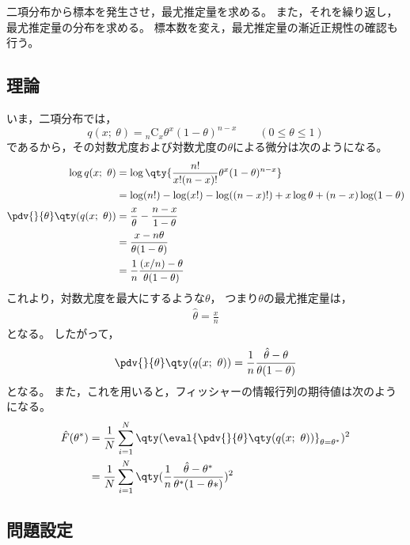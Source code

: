 \documentclass[class=jsarticle, crop=false, dvipdfmx, fleqn]{standalone}
\begin{document}
\section{}

二項分布から標本を発生させ，最尤推定量を求める。
また，それを繰り返し，最尤推定量の分布を求める。
標本数を変え，最尤推定量の漸近正規性の確認も行う。


\subsection*{理論}

いま，二項分布では，
\begin{equation}
    q(x;\ \theta) = {}_n\mathrm{C}_x \theta^x (1-\theta)^{n-x}
    \qquad (0 \le \theta \le 1)
\end{equation}
であるから，その対数尤度および対数尤度の\(\theta\)による微分は次のようになる。
\begin{align}
    \log{q(x;\ \theta)}
        & = \log\qty{\frac{n!}{x!(n-x)!} \theta^x (1-\theta)^{n-x}} \\
        & = \log(n!) - \log(x!) - \log((n-x)!) + x\log\theta + (n-x)\log(1-\theta) \\
    \pdv{}{\theta} \qty(q(x;\ \theta))
        & = \frac{x}{\theta} - \frac{n-x}{1-\theta} \\
        & = \frac{x - n\theta}{\theta(1-\theta)} \\
        & = \frac{1}{n} \frac{(x/n) - \theta}{\theta(1-\theta)}
\end{align}
これより，対数尤度を最大にするような\(\theta\)，
つまり\(\theta\)の最尤推定量は，
\begin{align}
    \hat{\theta} = \frac{x}{n}
\end{align}
となる。
したがって，
\begin{equation}
    \pdv{}{\theta} \qty(q(x;\ \theta)) = \frac{1}{n} \frac{\hat{\theta} - \theta}{\theta(1-\theta)}
\end{equation}
となる。
また，これを用いると，フィッシャーの情報行列の期待値は次のようになる。
\begin{align}
    \hat{F}(\theta^*)
        & = \frac{1}{N} \sum_{i=1}^{N} \qty(\eval{\pdv{}{\theta} \qty(q(x;\ \theta))}_{\theta = \theta^*})^2 \\
        & = \frac{1}{N} \sum_{i=1}^{N} \qty(\frac{1}{n} \frac{\hat{\theta} - \theta^*}{\theta^* (1-\theta*)})^2
\end{align}



\subsection*{問題設定}
\end{document}
